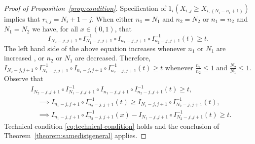 \documentclass[12pt]{article}
\begin{document}
\begin{proof}[Proof of Proposition~\ref{prop:condition}]
Specification of $1_i(X_{i,j} \geq X_{i,(N_i - n_i + 1)})$ implies that $r_{i,j} = N_i + 1 - j$. When either $n_1 = N_1$ and $n_2 = N_2$ or $n_1 = n_2$ and $N_1 = N_2$ we have, for all $x \in (0,1)$, that
$$
  I_{N_2-j,j+1} \circ I_{N_1-j,j+1}^{-1} \circ I_{n_1-j,j+1} \circ I_{n_2-j,j+1}^{-1} (t) \geq t.
$$
The left hand side of the above equation increases whenever $n_1$ or $N_1$ are increased \citep{askitis2021logarithmic}, or $n_2$ or $N_1$ are decreased. Therefore, 
$
  I_{N_2-j,j+1} \circ I_{N_1-j,j+1}^{-1} \circ I_{n_1-j,j+1} \circ I_{n_2-j,j+1}^{-1} (t) \geq t
$
whenever $\frac{n_1}{n_2}\leq 1$ and $\frac{N_2}{N_1} \leq 1$. Observe that
\begin{align*}
&I_{N_2-j,j+1} \circ I_{N_1-j,j+1}^{-1} \circ I_{n_1-j,j+1} \circ I_{n_2-j,j+1}^{-1} (t) \geq t, \\ 
&\quad\implies I_{n_1-j,j+1} \circ I_{n_2-j,j+1}^{-1} (t) \geq I_{N_1-j,j+1} \circ I_{N_2-j,j+1}^{-1}(t),   \\
&\quad\implies I_{n_1-j,j+1} \circ I_{n_2-j,j+1}^{-1} (x) - I_{N_1-j,j+1} \circ I_{N_2-j,j+1}^{-1}(t) \geq t.
\end{align*}
Technical condition \eqref{eq:technical-condition} holds and the conclusion of Theorem~\ref{theorem:samedistgeneral} applies.
\end{proof}
\end{document}
